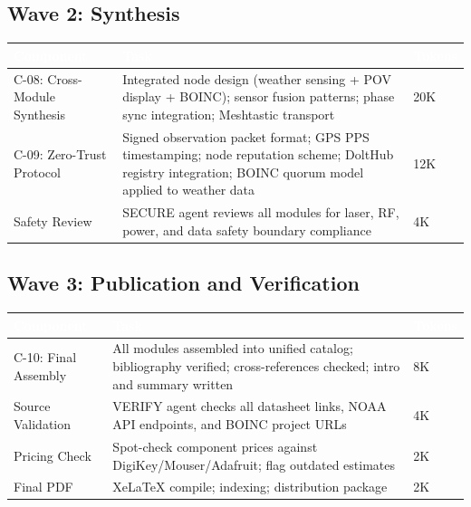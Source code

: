\documentclass[11pt,letterpaper]{article}
\newcommand{\tableheader}[1]{\textbf{\sffamily\textcolor{white}{#1}}}
\begin{document}
\subsection{Wave 2: Synthesis}

\begin{center}
\begin{tabularx}{\textwidth}{L{3cm}XC{2cm}}
\toprule
{}
\tableheader{Component} & \tableheader{Task} & \tableheader{Tokens} \\
\midrule
C-08: Cross-Module Synthesis & Integrated node design (weather sensing + POV display + BOINC); sensor fusion patterns; phase sync integration; Meshtastic transport & 20K \\
C-09: Zero-Trust Protocol & Signed observation packet format; GPS PPS timestamping; node reputation scheme; DoltHub registry integration; BOINC quorum model applied to weather data & 12K \\
Safety Review & SECURE agent reviews all modules for laser, RF, power, and data safety boundary compliance & 4K \\
\bottomrule
\end{tabularx}
\end{center}

\subsection{Wave 3: Publication and Verification}

\begin{center}
\begin{tabularx}{\textwidth}{L{3cm}XC{2cm}}
\toprule
{}
\tableheader{Component} & \tableheader{Task} & \tableheader{Tokens} \\
\midrule
C-10: Final Assembly & All modules assembled into unified catalog; bibliography verified; cross-references checked; intro and summary written & 8K \\
Source Validation & VERIFY agent checks all datasheet links, NOAA API endpoints, and BOINC project URLs & 4K \\
Pricing Check & Spot-check component prices against DigiKey/Mouser/Adafruit; flag outdated estimates & 2K \\
Final PDF & XeLaTeX compile; indexing; distribution package & 2K \\
\bottomrule
\end{tabularx}
\end{center}
\end{document}
